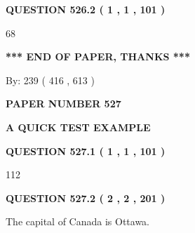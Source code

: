 \documentclass[12pt]{article}
\begin{document}
{\textbf{\Large{QUESTION
526.2 
 ( 1 , 1 , 101 )
}}}
  
  
 
 
\noindent{}

68
 
 
   
   
 \vspace{0.2in}
 
   
   
   
   
\vspace{1.0in} 
{\textbf{\large{ *** END OF PAPER, THANKS *** }}} 
   
   
\hspace{1.0in} By: 
 239 ( 416 ,  613 )
   
   
   
   
\newpage 
\setcounter{page}{ 
   527001 } 
   
   
   
   
 {\textbf{ \Large{ PAPER NUMBER  527  }}}
   
   
\vspace{0.2in}
   
   
   
   
   
   
 \vspace{0.2in}
{\LARGE {\textbf{ A QUICK TEST EXAMPLE}}}
   
   
  
\vspace{0.2in}
  
{\textbf{\Large{QUESTION
527.1 
 ( 1 , 1 , 101 )
}}}
  
  
 
 
\noindent{}

112
 
 
  
\vspace{0.2in}
  
{\textbf{\Large{QUESTION
527.2 
 ( 2 , 2 , 201 )
}}}
  
  
 
 
\noindent{}
 
 
The capital of Canada is Ottawa.
 
\end{document}

